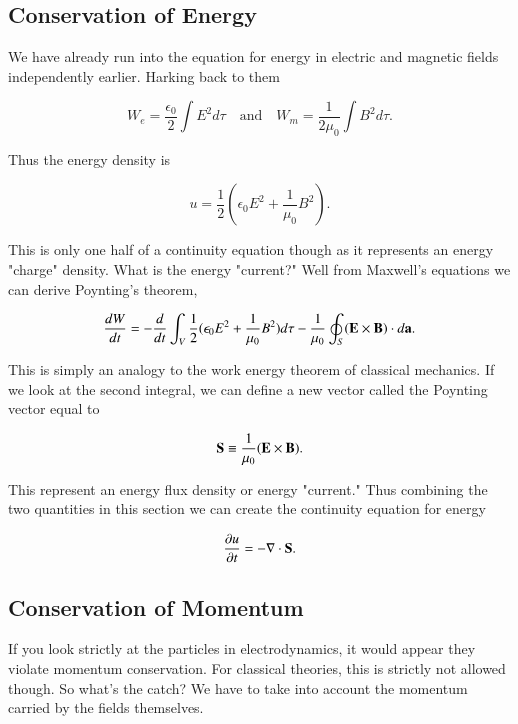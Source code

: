 \documentclass[preprint, review,12pt]{elsarticle}
\def\x{\times}
\def\.{\cdot}
\def\b{\textbf}
\def\={\equiv}
\def\div{\nabla \.}
\def\and{\quad \text{and} \quad}
\newcommand{\pd}[2]{\frac{\partial #1 }{\partial #2}}
\newcommand{\td}[2]{\frac{d #1 }{d #2}}
\begin{document}
\subsection{Conservation of Energy}

We have already run into the equation for energy in electric and magnetic fields independently earlier. Harking back to them

\begin{equation*}
    W_e = \frac{\epsilon_0}{2} \int E^2 d\tau \and W_m = \frac{1}{2\mu_0} \int B^2 d\tau.
\end{equation*}

Thus the energy density is

\begin{equation}
    u = \frac{1}{2}(\epsilon_0 E^2 + \frac{1}{\mu_0} B^2).
\end{equation}

This is only one half of a continuity equation though as it represents an energy "charge" density. What is the energy "current?" Well from Maxwell's equations we can derive Poynting's theorem,

\begin{equation}
    \td{W}{t} = - \td{}{t} \int_V \frac{1}{2}(\epsilon_0 E^2 + \frac{1}{\mu_0} B^2) d\tau - \frac{1}{\mu_0} \oint_S (\b E \x \b B) \. d\b a.
\end{equation}

This is simply an analogy to the work energy theorem of classical mechanics. If we look at the second integral, we can define a new vector called the Poynting vector equal to

\begin{equation}
    \b S \= \frac{1}{\mu_0} (\b E \x \b B).
\end{equation}

This represent an energy flux density or energy "current." Thus combining the two quantities in this section we can create the continuity equation for energy

\begin{equation}
    \pd{u}{t} = - \div \b S.    
\end{equation}

\subsection{Conservation of Momentum}

If you look strictly at the particles in electrodynamics, it would appear they violate momentum conservation. For classical theories, this is strictly not allowed though. So what's the catch? We have to take into account the momentum carried by the fields themselves. 
\end{document}
